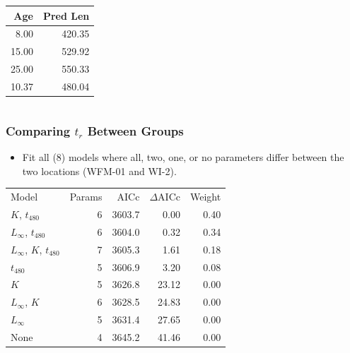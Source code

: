 \documentclass[xcolor=dvipsnames]{beamer}\usepackage[]{graphicx}\usepackage[]{color}
\begin{document}
\begin{frame}[fragile, t]
\begin{columns}
\begin{column}{0.5\textwidth}
\smallskip
\begin{table}[ht]
\centering
\begin{tabular}{rr}
  \hline
Age & Pred Len \\ 
  \hline
8.00 & 420.35 \\ 
  15.00 & 529.92 \\ 
  25.00 & 550.33 \\ 
  10.37 & 480.04 \\ 
   \hline
\end{tabular}
\end{table}

\end{column}
\end{columns}
\end{frame}




\begin{frame}[fragile, t]
\frametitle{Comparing $t_{r}$ Between Groups}
\begin{itemize}
  \item Fit all (8) models where all, two, one, or no parameters differ between the two locations (WFM-01 and WI-2).
\end{itemize}
\pause
\bigskip
\begin{table}[ht]
\centering
\begin{tabular}{lrrrr}
  \hline
Model & Params & AICc & $\Delta$AICc & Weight \\ 
  \rowcolor{light-gray} \hline
$K$, $t_{480}$ & 6 & 3603.7 & 0.00 & 0.40 \\ 
   \rowcolor{light-gray}$L_{\infty}$, $t_{480}$ & 6 & 3604.0 & 0.32 & 0.34 \\ 
   \rowcolor{light-gray}$L_{\infty}$, $K$, $t_{480}$ & 7 & 3605.3 & 1.61 & 0.18 \\ 
   \rowcolor{light-gray}$t_{480}$ & 5 & 3606.9 & 3.20 & 0.08 \\ 
  $K$ & 5 & 3626.8 & 23.12 & 0.00 \\ 
  $L_{\infty}$, $K$ & 6 & 3628.5 & 24.83 & 0.00 \\ 
  $L_{\infty}$ & 5 & 3631.4 & 27.65 & 0.00 \\ 
  None & 4 & 3645.2 & 41.46 & 0.00 \\ 
   \hline
\end{tabular}
\end{table}

\end{frame}
\end{document}
